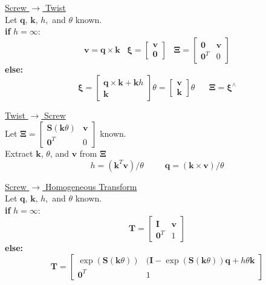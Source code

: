 \documentclass[twocolumn]{article}    %
\begin{document}
\noindent\underline{Screw \(\longrightarrow\) Twist}\\
Let \(\bm{q},\, \bm{k},\,h,\) and \(\theta\) known.\\
\textbf{if} \(h= \infty\):\\
\begin{equation*}
    \bm{v} = \bm{q} \times \bm{k} \hspace{10pt} \bm{\xi} = \begin{bmatrix}
        \bm{v} \\ \bm{0}
    \end{bmatrix} \hspace{10pt} \bm{\Xi} = \begin{bmatrix}
        \bm{0} & \bm{v} \\  \bm{0}^T & 0
    \end{bmatrix}
\end{equation*}
\textbf{else:}
\begin{equation*}
    \bm{\xi} = \begin{bmatrix}
        \bm{q} \times \bm{k} + \bm{k}h \\ \bm{k}
    \end{bmatrix} \theta = \begin{bmatrix}
        \bm{v} \\ \bm{k}
    \end{bmatrix}\theta  \hspace{20pt} \bm{\Xi} = \bm{\xi}^{\wedge}
\end{equation*}


\noindent\underline{Twist \(\longrightarrow\) Screw}\\
Let \(\bm{\Xi} = \begin{bmatrix}
    \bm{S}(\bm{k}\theta) & \bm{v} \\ \bm{0}^T & 0 
\end{bmatrix}\) known.\\
\hspace{10pt}Extract \(\bm{k}\), \(\theta\), and \(\bm{v}\) from \(\bm{\Xi}\)
\begin{equation*}
    h = (\bm{k}^T\bm{v})/\theta \hspace{30pt} \bm{q} =  (\bm{k}\times \bm{v})/ \theta
\end{equation*}

\noindent\underline{Screw \(\longrightarrow\) Homogeneous Transform}\\
Let \(\bm{q},\, \bm{k},\,h,\) and \(\theta\) known.\\
\textbf{if} \(h=\infty\):
\begin{equation*}
    \bm{T} = \begin{bmatrix}
        \bm{I} & \bm{v} \\ \bm{0}^T & 1
    \end{bmatrix}
\end{equation*}
\textbf{else:}
\begin{equation*}
    \bm{T} = \begin{bmatrix}
        \operatorname{exp}(\bm{S}(\bm{k}\theta)) & (\bm{I} - \operatorname{exp}(\bm{S}(\bm{k}\theta))\bm{q} + h\theta\bm{k} \\ \bm{0}^T & 1
    \end{bmatrix}
\end{equation*}
\end{document}

